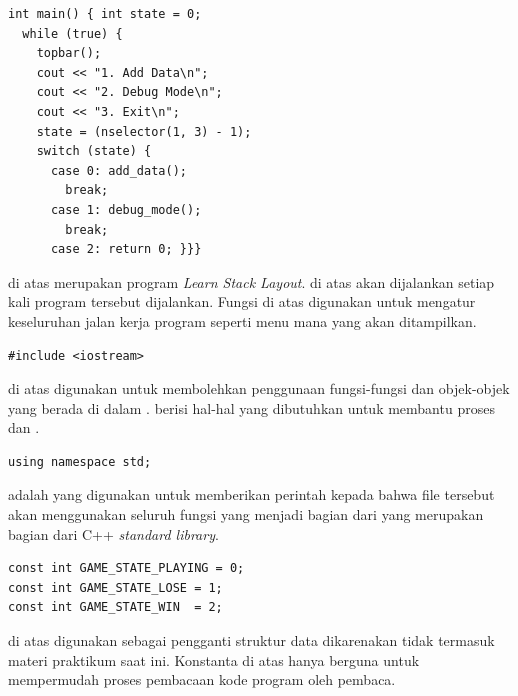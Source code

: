 \documentclass[../main.tex]{subfiles}
\begin{document}
\begin{code}
\begin{verbatim}
int main() { int state = 0;
  while (true) {
    topbar();
    cout << "1. Add Data\n";
    cout << "2. Debug Mode\n";
    cout << "3. Exit\n";
    state = (nselector(1, 3) - 1);
    switch (state) {
      case 0: add_data();
        break;
      case 1: debug_mode();
        break;
      case 2: return 0; }}}
\end{verbatim}
\end{code}

{\Script} di atas merupakan {\entry} {\point} program \textit{Learn Stack Layout}. {\Script} di atas akan dijalankan setiap kali program tersebut dijalankan. Fungsi di atas digunakan untuk mengatur keseluruhan jalan kerja program seperti menu mana yang akan ditampilkan.

\newpage
{}
\vspace{-1ex}
\begin{code}
\begin{verbatim}
#include <iostream>
\end{verbatim}
\end{code}

{\Script} di atas digunakan untuk membolehkan penggunaan fungsi-fungsi dan objek-objek yang berada di dalam {\header} {\file} . {\Header} {\file}  berisi hal-hal yang dibutuhkan untuk membantu proses {\ioi} dan {\ioo}.

\begin{code}
\begin{verbatim}
using namespace std;
\end{verbatim}
\end{code}

{\Script}  adalah {\statement} yang digunakan untuk memberikan perintah kepada {\compiler} bahwa file tersebut akan menggunakan seluruh fungsi yang menjadi bagian dari  yang merupakan bagian dari C++ \textit{standard library}.

\begin{code}
\begin{verbatim}
const int GAME_STATE_PLAYING = 0;
const int GAME_STATE_LOSE = 1;
const int GAME_STATE_WIN  = 2;
\end{verbatim}
\end{code}

{\Script} di atas digunakan sebagai pengganti struktur data  dikarenakan tidak termasuk materi praktikum saat ini. Konstanta di atas hanya berguna untuk mempermudah proses pembacaan kode program oleh pembaca.
\end{document}
